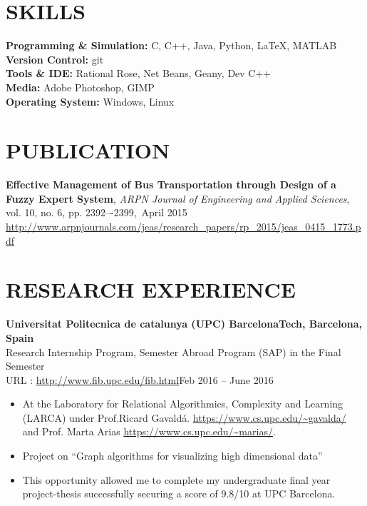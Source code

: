 \documentclass[margin, 10pt]{res} %
\begin{document}
\begin{resume}
\section{SKILLS} 
{\textbf{Programming \& Simulation:}} C, C++, Java, Python, \LaTeX  , MATLAB  \\
{\textbf{Version Control:}} git  \\
{\textbf{Tools \& IDE:}} Rational Rose, Net Beans, Geany, Dev C++  \\
{\textbf{Media:}} Adobe Photoshop, GIMP  \\
{\textbf{Operating System:}} Windows, Linux  \\
\section{PUBLICATION}
\textbf{
Effective Management of Bus Transportation through Design of a Fuzzy Expert System},
\emph{ARPN Journal of Engineering and Applied Sciences}, vol. 10, no. 6, pp. 2392–-2399,\, April 2015 \\
\url{http://www.arpnjournals.com/jeas/research_papers/rp_2015/jeas_0415_1773.pdf}

\section{RESEARCH EXPERIENCE}
{\textbf{Universitat Politecnica de catalunya (UPC) BarcelonaTech, Barcelona, Spain} \\
Research Internship Program, Semester Abroad Program (SAP) in the Final Semester\\URL : \url{http://www.fib.upc.edu/fib.html}\hfill Feb 2016 -- June 2016
\begin{itemize} \itemsep -2pt %
\item  At the Laboratory for Relational Algorithmics, Complexity and Learning (LARCA) under Prof.Ricard Gavald\'a. \url{https://www.cs.upc.edu/~gavalda/} and Prof. Marta Arias \url{https://www.cs.upc.edu/~marias/}.
\item Project on ``Graph algorithms for visualizing high dimensional data''
\item This opportunity allowed me to complete my undergraduate final year project-thesis successfully securing a score of 9.8/10 at UPC Barcelona.
\end{itemize}

}
\end{resume}
\end{document}
